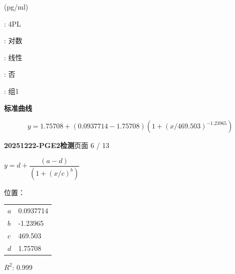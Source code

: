 \documentclass[UTF8,10pt,a4paper,fontset=fandol]{ctexart}
\newcommand{\fieldvalue}[1]{#1}
\begin{document}
\medskip
{}

 (pg/ml)

:
\fieldvalue{4PL}

:
\fieldvalue{对数}

:
\fieldvalue{线性}

:
\fieldvalue{否}

:
\fieldvalue{组1}

\bigskip
\begin{center}
\textbf{标准曲线}

\end{center}

\[
y = 1.75708 + \left(0.0937714 - 1.75708\right)
\left(1 + \left(x/469.503\right)^{-1.23965}\right)
\]

\newpage

\begin{center}
\textbf{20251222-PGE2检测}\hfill 页面 6 / 13
\end{center}

\noindent
$y=d+\dfrac{(a-d)}{(1+(x/c)^b)}$

\noindent
位置：

\begin{tabular}{ll}
$a$ & 0.0937714\\
$b$ & -1.23965\\
$c$ & 469.503\\
$d$ & 1.75708
\end{tabular}

\medskip

\noindent
$R^2$: 0.999

\medskip
\end{document}
